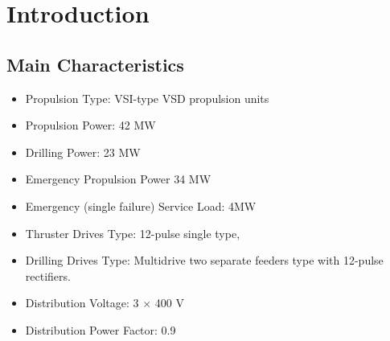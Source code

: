 \section{Introduction}

\subsection{Main Characteristics}

\begin{itemize}
    \item Propulsion Type: VSI-type VSD propulsion units %
    \item Propulsion Power: 42 MW
    \item Drilling Power: 23 MW
    \item Emergency Propulsion Power 34 MW
    \item Emergency (single failure) Service Load: 4MW
    \item Thruster Drives Type: 12-pulse single type, 
    \item Drilling Drives Type: Multidrive two separate feeders type with 12-pulse rectifiers.
    \item Distribution Voltage: 3 $ \times $ 400 V
    \item Distribution Power Factor: 0.9
\end{itemize}


 